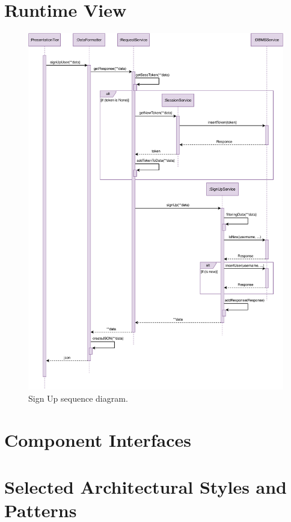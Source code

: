 \section{Runtime View}

\begin{figure}[H]
	\centering
	\includegraphics[width=1.0\textwidth]{images/signUp_sequence_diagram.pdf}
	\caption{Sign Up sequence diagram.}
\end{figure}

\section{Component Interfaces}

\section{Selected Architectural Styles and Patterns}

